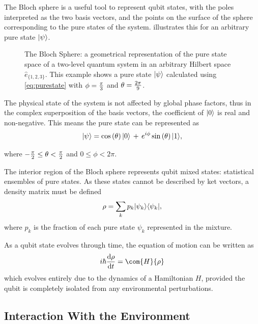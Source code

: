 The Bloch sphere \cite{Bloch1946} is a useful tool to represent qubit states, with the poles interpreted as the two basis vectors, and the points on the surface of the sphere corresponding to the pure states of the system.
 illustrates this for an arbitrary pure state $\lvert\psi\rangle$.
\begin{figure}[htp]
\resizebox{0.5\textwidth}{!}{}
\caption[Bloch Sphere]{\label{fig:bloch}The Bloch Sphere: a geometrical representation of the pure state space of a two-level quantum system in an arbitrary Hilbert space $\hat{e}_{\{1,2,3\}}$. This example shows a pure state $\lvert\psi\rangle$ calculated using \cref{eq:purestate} with $\cramped{\phi=\frac{\pi}{3}}$ and $\cramped{\theta=\frac{2\pi}{9}}$. }
\end{figure}

The physical state of the system is not affected by global phase factors, thus in the complex superposition of the basis vectors, the coefficient of $\lvert0\rangle$ is real and non-negative.
This means the pure state can be represented as
\begin{equation}
\lvert\psi\rangle = \cos\left(\theta\right) \lvert0\rangle \, + \, e^{i \phi}  \sin\left(\theta\right) \lvert1\rangle,
\label{eq:purestate}
\end{equation}

where $\cramped{-\frac{\pi}{2} \leq \theta < \frac{\pi}{2}}$ and $0 \leq \phi < 2 \pi$.

The interior region of the Bloch sphere represents qubit mixed states: statistical ensembles of pure states.
As these states cannot be described by ket vectors, a density matrix must be defined
\begin{equation}
\rho = \sum_k p_k \lvert\psi_k\rangle \langle\psi_k\rvert,
\label{eq:densmat}
\end{equation}
where $p_k$ is the fraction of each pure state $\psi_k$ represented in the mixture.

As a qubit state evolves through time, the equation of motion can be written as
\begin{equation}
i\hbar \frac{\mathrm{d}\rho}{\mathrm{d}t} = \com{H}{\rho}
\label{eq:tevqubit}
\end{equation}
which evolves entirely due to the dynamics of a Hamiltonian $H$,
provided the qubit is completely isolated from any environmental perturbations.

\subsection{Interaction With the Environment}\label{sec:envint}

